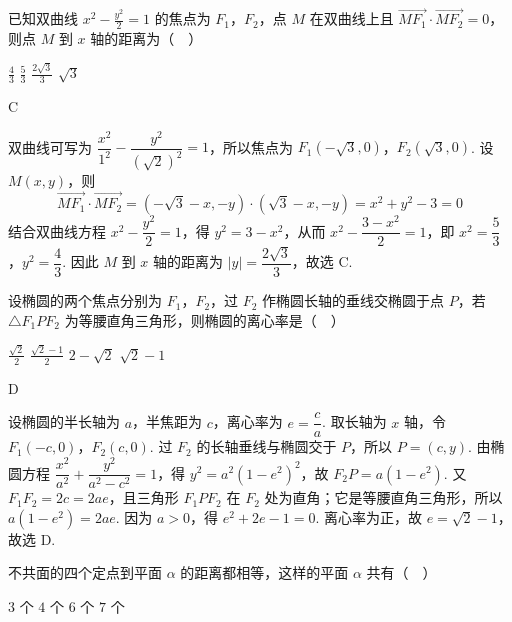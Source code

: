 \begin{problem}
已知双曲线 \(x^{2} - \frac{y^{2}}{2} = 1\) 的焦点为 \(F_{1}\)，\(F_{2}\)，点 \(M\) 在双曲线上且 \(\overrightarrow{MF_{1}} \cdot \overrightarrow{MF_{2}} = 0\)，则点 \(M\) 到 \(x\) 轴的距离为（\(\quad\)）

\choices
    {\(\frac{4}{3}\)}
    {\(\frac{5}{3}\)}
    {\(\frac{2\sqrt{3}}{3}\)}
    {\(\sqrt{3}\)}
\end{problem}

\begin{answer}
C
\end{answer}

\begin{solution}
双曲线可写为 \(\dfrac{x^2}{1^2}-\dfrac{y^2}{(\sqrt{2})^2}=1\)，所以焦点为 \(F_1(-\sqrt{3},0)\)，\(F_2(\sqrt{3},0)\). 设 \(M(x,y)\)，则
\[
\overrightarrow{MF_1}\cdot\overrightarrow{MF_2}=(-\sqrt{3}-x,-y)\cdot(\sqrt{3}-x,-y)=x^2+y^2-3=0
\]
结合双曲线方程 \(x^2-\dfrac{y^2}{2}=1\)，得 \(y^2=3-x^2\)，从而 \(x^2-\dfrac{3-x^2}{2}=1\)，即 \(x^2=\dfrac{5}{3}\)，\(y^2=\dfrac{4}{3}\). 因此 \(M\) 到 \(x\) 轴的距离为 \(|y|=\dfrac{2\sqrt{3}}{3}\)，故选 C.
\end{solution}

\begin{problem}
设椭圆的两个焦点分别为 \(F_{1}\)，\(F_{2}\)，过 \(F_{2}\) 作椭圆长轴的垂线交椭圆于点 \(P\)，若 \(\triangle F_{1}PF_{2}\) 为等腰直角三角形，则椭圆的离心率是（\(\quad\)）

\choices
    {\(\frac{\sqrt{2}}{2}\)}
    {\(\frac{\sqrt{2} - 1}{2}\)}
    {\(2 - \sqrt{2}\)}
    {\(\sqrt{2} - 1\)}
\end{problem}

\begin{answer}
D
\end{answer}

\begin{solution}
设椭圆的半长轴为 \(a\)，半焦距为 \(c\)，离心率为 \(e=\dfrac{c}{a}\). 取长轴为 \(x\) 轴，令 \(F_1(-c,0)\)，\(F_2(c,0)\). 过 \(F_2\) 的长轴垂线与椭圆交于 \(P\)，所以 \(P=(c,y)\). 由椭圆方程 \(\dfrac{x^2}{a^2}+\dfrac{y^2}{a^2-c^2}=1\)，得 \(y^2=a^2(1-e^2)^2\)，故 \(F_2P=a(1-e^2)\). 又 \(F_1F_2=2c=2ae\)，且三角形 \(F_1PF_2\) 在 \(F_2\) 处为直角；它是等腰直角三角形，所以 \(a(1-e^2)=2ae\). 因为 \(a>0\)，得 \(e^2+2e-1=0\). 离心率为正，故 \(e=\sqrt{2}-1\)，故选 D.
\end{solution}

\begin{problem}
不共面的四个定点到平面 \(\alpha\) 的距离都相等，这样的平面 \(\alpha\) 共有（\(\quad\)）

\choices
    {\(3\text{ 个}\)}
    {\(4\text{ 个}\)}
    {\(6\text{ 个}\)}
    {\(7\text{ 个}\)}
\end{problem}

